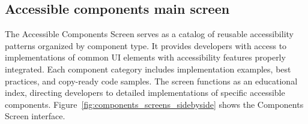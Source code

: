 \subsection{Accessible components main screen}

The Accessible Components Screen serves as a catalog of reusable accessibility patterns organized by component type. It provides developers with access to implementations of common UI elements with accessibility features properly integrated. Each component category includes implementation examples, best practices, and copy-ready code samples. The screen functions as an educational index, directing developers to detailed implementations of specific accessible components. Figure~\ref{fig:components_screens_sidebyside} shows the Components Screen interface.

\begin{figure}[ht]
    \centering
    \begin{subfigure}[b]{0.48\textwidth}
        \centering

\end{subfigure}
\end{figure}
